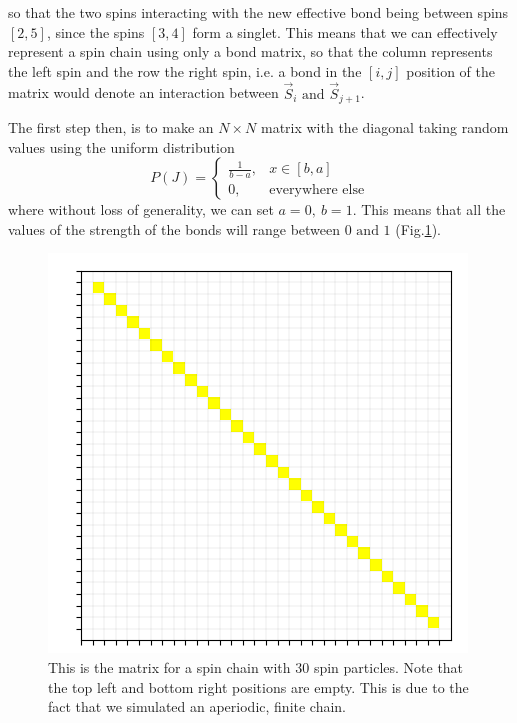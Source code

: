 \documentclass[../numerical,,../../main.tex]{subfiles}
\begin{document}
so that the two spins interacting with the new effective bond being between spins $[2,5]$, since the spins $[3,4]$ form a singlet. This means that we can effectively represent a spin chain using only a bond matrix, so that the column represents the left spin and the row the right spin, i.e. a bond in the $[i,j]$ position of the matrix would denote an interaction between $\vec{S}_{i}\text{ and }\vec{S}_{j+1}$.\\
\newpage

The first step then, is to make an $N\times N$ matrix with the diagonal taking random values using the uniform distribution
\begin{equation}
    P(J)=\left\{\begin{array}{cc}
        \frac{1}{b-a} , & x\in[b,a]\\
        0,& \text{everywhere else}
    \end{array}\right.
\end{equation}
where without loss of generality, we can set $a=0,\ b=1$. This means that all the values of the strength of the bonds will range between $0\text{ and }1$ (Fig.\ref{fig:rgstart}).
\begin{figure}[h!]
    \centering
    \includegraphics[scale=0.3]{Chapter5/Figures/RG/startmatrix.png}
    \caption{This is the matrix for a spin chain with 30 spin particles. Note that the top left and bottom right positions are empty. This is due to the fact that we simulated an aperiodic, finite chain.}
    \label{fig:rgstart}
\end{figure}
\end{document}
